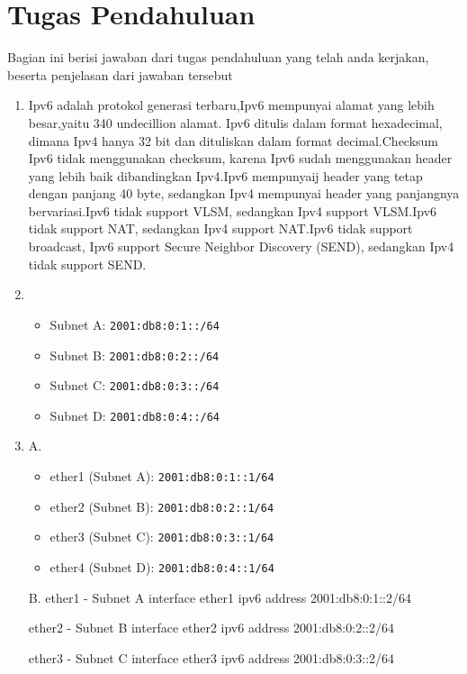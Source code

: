 \section{Tugas Pendahuluan}
Bagian ini berisi jawaban dari tugas pendahuluan yang telah anda kerjakan, beserta penjelasan dari jawaban tersebut
\begin{enumerate}
	\item Ipv6 adalah protokol generasi terbaru,Ipv6 mempunyai alamat yang lebih besar,yaitu 340 undecillion alamat.
	Ipv6 ditulis dalam format hexadecimal, dimana Ipv4 hanya 32 bit dan dituliskan dalam format decimal.Checksum
	Ipv6 tidak menggunakan checksum, karena Ipv6 sudah menggunakan header yang lebih baik dibandingkan Ipv4.Ipv6 mempunyaij
	header yang tetap dengan panjang 40 byte, sedangkan Ipv4 mempunyai header yang panjangnya bervariasi.Ipv6
	tidak support VLSM, sedangkan Ipv4 support VLSM.Ipv6 tidak support NAT, sedangkan Ipv4 support NAT.Ipv6 tidak support broadcast,
	Ipv6 support Secure Neighbor Discovery (SEND), sedangkan Ipv4 tidak support SEND.
	\item \begin{itemize}
		\item Subnet A: \texttt{2001:db8:0:1::/64}
		\item Subnet B: \texttt{2001:db8:0:2::/64}
		\item Subnet C: \texttt{2001:db8:0:3::/64}
		\item Subnet D: \texttt{2001:db8:0:4::/64}
	\end{itemize}
	 
	\item 
	A.
	\begin{itemize}
		\item ether1 (Subnet A): \texttt{2001:db8:0:1::1/64}
		\item ether2 (Subnet B): \texttt{2001:db8:0:2::1/64}
		\item ether3 (Subnet C): \texttt{2001:db8:0:3::1/64}
		\item ether4 (Subnet D): \texttt{2001:db8:0:4::1/64}
	\end{itemize}
	B.
	ether1 - Subnet A
	interface ether1
	ipv6 address 2001:db8:0:1::2/64

	ether2 - Subnet B
	interface ether2
	ipv6 address 2001:db8:0:2::2/64

	ether3 - Subnet C
	interface ether3
	ipv6 address 2001:db8:0:3::2/64


\end{enumerate}
